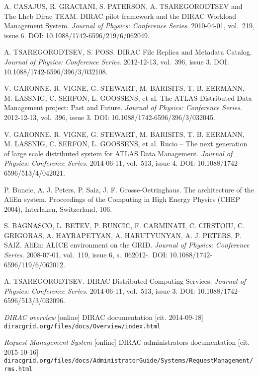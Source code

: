 \begin{thebibliography}{99}
	A. CASAJUS, R. GRACIANI, S. PATERSON, A. TSAREGORODTSEV and The Lhcb Dirac TEAM. 
	DIRAC pilot framework and the DIRAC Workload Management System. 
	\textit{Journal of Physics: Conference Series}. 2010-04-01, vol.~219, issue 6. 
	DOI: 10.1088/1742-6596/219/6/062049. 
	
	A. TSAREGORODTSEV, S. POSS. 
	DIRAC File Replica and Metadata Catalog. 
	\textit{Journal of Physics: Conference Series}. 2012-12-13, vol.~396, issue 3. 
	DOI: 10.1088/1742-6596/396/3/032108. 
	
	V. GARONNE, R. VIGNE, G. STEWART, M. BARISITS, T. B. EERMANN, M. LASSNIG, C. SERFON, L. GOOSSENS, et al. 
	The ATLAS Distributed Data Management project: Past and Future. 
	\textit{Journal of Physics: Conference Series}. 2012-12-13, vol.~396, issue 3.
	DOI: 10.1088/1742-6596/396/3/032045. 
	
	V. GARONNE, R. VIGNE, G. STEWART, M. BARISITS, T. B. EERMANN, M. LASSNIG, C. SERFON, L. GOOSSENS, et al. 
	Rucio – The next generation of large scale distributed system for ATLAS Data Management. 
	\textit{Journal of Physics: Conference Series}. 2014-06-11, vol.~513, issue 4.
	DOI: 10.1088/1742-6596/513/4/042021.
	
	P. Buncic, A. J. Peters, P. Saiz, J. F. Grosse-Oetringhaus. 
	The architecture of the AliEn system. Proceedings of the Computing in High Energy Physics (CHEP 2004), 				
	Interlaken, Switzerland, 106.
	
	S. BAGNASCO, L. BETEV, P. BUNCIC, F. CARMINATI, C. CIRSTOIU, C. GRIGORAS, A. HAYRAPETYAN, A. HARUTYUNYAN, 
	A. J. PETERS, P. SAIZ. 
	AliEn: ALICE environment on the GRID. 
	\textit{Journal of Physics: Conference Series}. 2008-07-01, vol.~119, issue 6, s.~062012-. 
	DOI: 10.1088/1742-6596/119/6/062012.
	
	A. TSAREGORODTSEV.
	DIRAC Distributed Computing Services. 
	\textit{Journal of Physics: Conference Series}. 2014-06-11, vol.~513, issue 3. 
	DOI: 10.1088/1742-6596/513/3/032096. 

	\emph{DIRAC overview} [online] 
	DIRAC documentation [cit. 2014-09-18]
	\texttt{diracgrid.org/files/docs/Overview/index.html}
	
	\emph{Request Management System} [online] 
	DIRAC administrators documentation [cit. 2015-10-16]
	\texttt{diracgrid.org/files/docs/AdministratorGuide/Systems/RequestManagement/rms.html}
	

		

\end{thebibliography}

